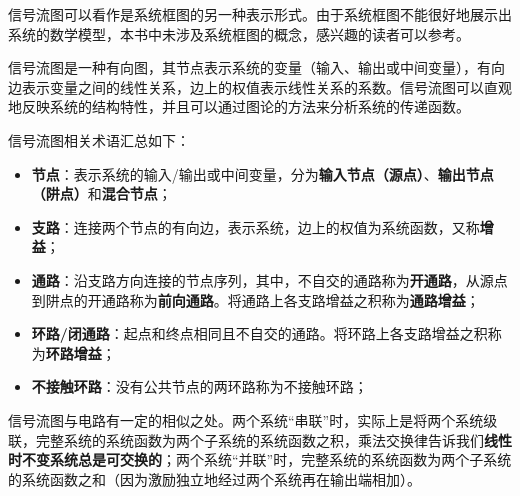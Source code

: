 信号流图可以看作是系统框图的另一种表示形式。由于系统框图不能很好地展示出系统的数学模型，本书中未涉及系统框图的概念，感兴趣的读者可以参考\cite{oppenheim1997signals}\cite{signal_systems}。

\begin{definition}
信号流图是一种有向图，其节点表示系统的变量（输入、输出或中间变量），有向边表示变量之间的线性关系，边上的权值表示线性关系的系数。信号流图可以直观地反映系统的结构特性，并且可以通过图论的方法来分析系统的传递函数。

信号流图相关术语汇总如下：\begin{itemize}
    \item \textbf{节点}：表示系统的输入/输出或中间变量，分为\textbf{输入节点（源点）}、\textbf{输出节点（阱点）}和\textbf{混合节点}；
    \item \textbf{支路}：连接两个节点的有向边，表示系统，边上的权值为系统函数，又称\textbf{增益}；
    \item \textbf{通路}：沿支路方向连接的节点序列，其中，不自交的通路称为\textbf{开通路}，从源点到阱点的开通路称为\textbf{前向通路}。将通路上各支路增益之积称为\textbf{通路增益}；
    \item \textbf{环路/闭通路}：起点和终点相同且不自交的通路。将环路上各支路增益之积称为\textbf{环路增益}；
    \item \textbf{不接触环路}：没有公共节点的两环路称为不接触环路；
\end{itemize}
\end{definition}

信号流图与电路有一定的相似之处。两个系统“串联”时，实际上是将两个系统级联，完整系统的系统函数为两个子系统的系统函数之积，乘法交换律告诉我们\textbf{线性时不变系统总是可交换的}；两个系统“并联”时，完整系统的系统函数为两个子系统的系统函数之和（因为激励独立地经过两个系统再在输出端相加）。

